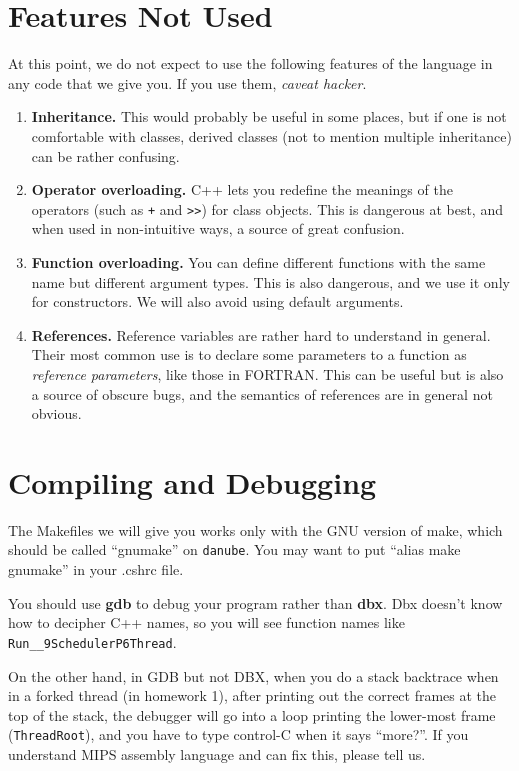 \section{Features Not Used}

At this point, we do not expect to use the following features of the
language in any code that we give you.  If you use them, {\it caveat
hacker}.
\begin{enumerate}
\item {\bf Inheritance.}  This would probably be useful in some
places, but if one is not comfortable with classes, derived classes
(not to mention multiple inheritance) can be rather confusing.
\item {\bf Operator overloading.}  C++ lets you redefine the meanings
of the operators (such as {\tt +} and \verb+>>+) for class objects.
This is dangerous at best, and when used in non-intuitive ways, a
source of great confusion.
\item {\bf Function overloading.}  You can define different functions
with the same name but different argument types.  This is also
dangerous, and we use it only for constructors.  We will also avoid
using default arguments.
\item {\bf References.}  Reference variables are rather hard to
understand in general.  Their most common use is to declare some
parameters to a function as {\it reference parameters}, like those in
FORTRAN.  This can be useful but is also a source of obscure bugs, and
the semantics of references are in general not obvious.
\end{enumerate}

\section{Compiling and Debugging}

The Makefiles we will give you works only with the GNU version of
make, which should be called ``gnumake'' on {\tt danube}.  You may want
to put ``alias make gnumake'' in your .cshrc file.

You should use {\bf gdb} to debug your program rather than {\bf dbx}.
Dbx doesn't know how to decipher C++ names, so you will see function
names like \verb+Run__9SchedulerP6Thread+.

On the other hand, in GDB but not DBX, when you do a stack backtrace
when in a forked thread (in homework 1), after printing out the
correct frames at the top of the stack, the debugger will go into a
loop printing the lower-most frame ({\tt ThreadRoot}), and you have to
type control-C when it says ``more?''.  If you understand MIPS
assembly language and can fix this, please tell us.

